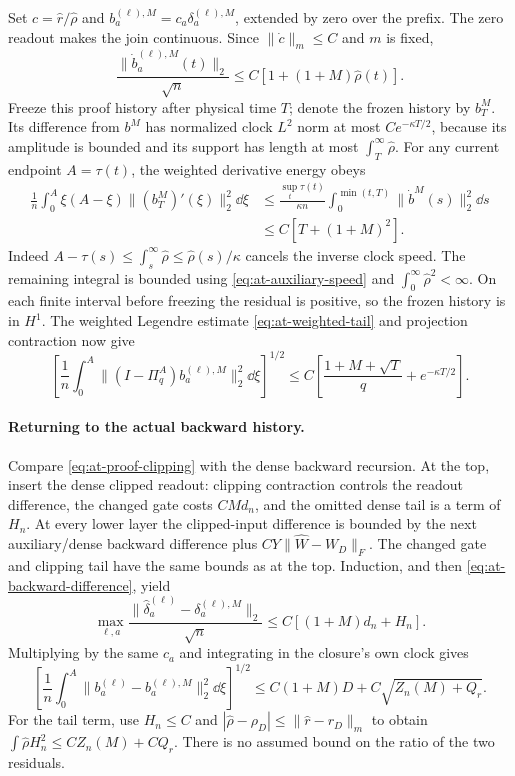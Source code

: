 Set $c=\widehat r/\widehat\rho$ and $b_a^{(\ell),M}=c_a\delta_a^{(\ell),M}$,
extended by zero over the prefix.  The zero readout makes the join
continuous.  Since $\|\dot c\|_m\le C$ and $m$ is fixed,
\begin{equation}
 \frac{\|\dot b_a^{(\ell),M}(t)\|_2}{\sqrt n}
 \le C[1+(1+M)\widehat\rho(t)].
 \label{eq:at-auxiliary-speed}
\end{equation}
Freeze this proof history after physical time $T$; denote the frozen history
by $b_T^M$.  Its difference from $b^M$ has normalized clock $L^2$ norm
at most $Ce^{-\kappa T/2}$, because its amplitude is bounded and its
support has length at most $\int_T^\infty\widehat\rho$.
For any current endpoint $A=\tau(t)$, the weighted derivative energy obeys
\begin{align}
 \frac1n\int_0^A\xi(A-\xi)\|(b_T^M)'(\xi)\|_2^2\dd\xi
 &\le\frac{\sup_t\tau(t)}{\kappa n}
           \int_0^{\min(t,T)}\|\dot b^M(s)\|_2^2\dd s\nonumber\\
 &\le C[T+(1+M)^2].
 \label{eq:at-weighted-auxiliary}
\end{align}
Indeed $A-\tau(s)\le\int_s^\infty\widehat\rho
\le\widehat\rho(s)/\kappa$ cancels the inverse clock speed.
The remaining integral is bounded using \eqref{eq:at-auxiliary-speed} and
$\int_0^\infty\widehat\rho^2<\infty$.  On each finite interval before
freezing the residual is positive, so the frozen history is in $H^1$.
The weighted Legendre estimate \eqref{eq:at-weighted-tail} and projection
contraction now give
\begin{equation}
 \left[\frac1n\int_0^A\|(I-\Pi_q^A)b_a^{(\ell),M}\|_2^2\dd\xi\right]^{1/2}
 \le C\left[\frac{1+M+\sqrt T}{q}+e^{-\kappa T/2}\right].
 \label{eq:at-backward-tail}
\end{equation}

\paragraph{Returning to the actual backward history.}
Compare \eqref{eq:at-proof-clipping} with the dense backward recursion.
At the top, insert the dense clipped readout: clipping contraction controls
the readout difference, the changed gate costs $CMd_n$, and the omitted
dense tail is a term of $H_n$.  At every lower layer the clipped-input
difference is bounded by the next auxiliary/dense backward difference plus
$CY\|\widehat W-W_D\|_F$.  The changed gate and clipping tail have the
same bounds as at the top.  Induction, and then
\eqref{eq:at-backward-difference}, yield
\[
 \max_{\ell,a}\frac{\|\widehat\delta_a^{(\ell)}
                             -\delta_a^{(\ell),M}\|_2}{\sqrt n}
 \le C[(1+M)d_n+H_n].
\]
Multiplying by the same $c_a$ and integrating in the closure's own clock gives
\begin{equation}
 \left[\frac1n\int_0^A\|b_a^{(\ell)}-b_a^{(\ell),M}\|_2^2\dd\xi\right]^{1/2}
 \le C(1+M)D+C\sqrt{Z_n(M)+Q_r}.
 \label{eq:at-auxiliary-mismatch}
\end{equation}
For the tail term, use $H_n\le C$ and
$|\widehat\rho-\rho_D|\le\|\widehat r-r_D\|_m$ to obtain
$\int\widehat\rho H_n^2\le C Z_n(M)+C Q_r$.
There is no assumed bound on the ratio of the two residuals.

